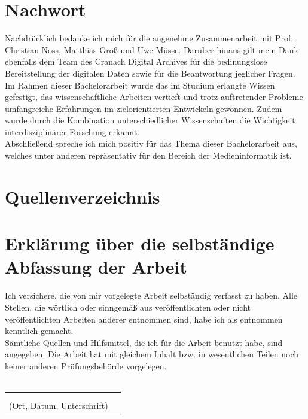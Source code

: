 \documentclass[a4paper,12pt,oneside]{article}
\begin{document}
  \section{Nachwort}
    Nachdrücklich bedanke ich mich für die angenehme Zusammenarbeit
    mit Prof. Christian Noss, Matthias Groß und Uwe Müsse. Darüber
    hinaus gilt mein Dank ebenfalls dem Team des Cranach Digital 
    Archives für die bedinungslose Bereitstellung der digitalen 
    Daten sowie für die Beantwortung jeglicher Fragen. \\
    Im Rahmen dieser Bachelorarbeit wurde das im Studium erlangte
    Wissen gefestigt, das wissenschaftliche Arbeiten 
    vertieft und trotz auftretender Probleme umfangreiche 
    Erfahrungen im zielorientierten
    Entwickeln gewonnen. Zudem wurde durch die Kombination
    unterschiedlicher Wissenschaften die Wichtigkeit 
    interdisziplinärer Forschung erkannt. \\    
    Abschließend spreche ich mich positiv für das
    Thema dieser Bachelorarbeit aus, welches
    unter anderen repräsentativ für den 
    Bereich der Medieninformatik ist. \newpage
  \section{Quellenverzeichnis}
    \printbibliography
  \newpage
  \pagestyle{empty}
  \section*{Erklärung über die selbständige Abfassung der Arbeit}
    Ich versichere, die von mir vorgelegte Arbeit selbständig verfasst zu haben.
    Alle Stellen, die wörtlich oder sinngemäß aus veröffentlichten oder nicht veröffentlichten Arbeiten anderer entnommen sind,
    habe ich als entnommen kenntlich gemacht.\\ 
    Sämtliche Quellen und Hilfsmittel, die ich für die Arbeit benutzt habe, sind
    angegeben. Die Arbeit hat mit gleichem Inhalt bzw. in wesentlichen Teilen noch keiner anderen Prüfungsbehörde vorgelegen.\\\\
    \begin{tabular}{cp{7cm}}
      & \\ 
      & \\ \hline
      \small (Ort, Datum, Unterschrift) & \normalsize \\
    \end{tabular}
  \newpage
  \thispagestyle{empty}
  
\end{document}
